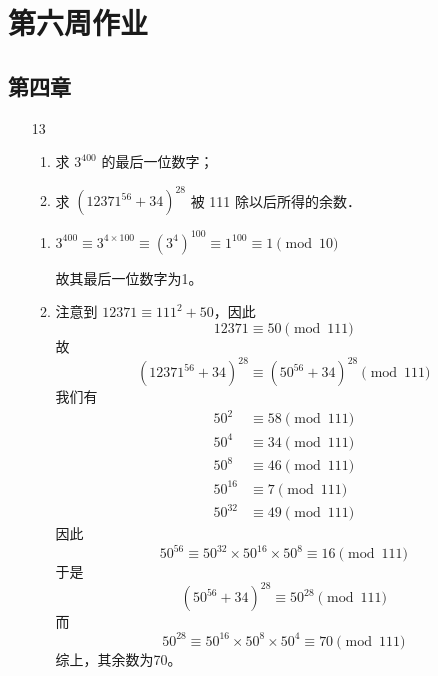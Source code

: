 \section{第六周作业}
\subsection*{第四章}

\begin{enumerate}
    \item[13] \begin{enumerate}
        \item 求 $3^{400}$ 的最后一位数字；
        \item 求 $\left(12371^{56}+34\right)^{28}$ 被 111 除以后所得的余数．
    \end{enumerate}

\begin{solution}
    \begin{enumerate}
        \item $3^{400} \equiv 3^{4 \times 100} \equiv (3^4)^{100} \equiv 1^{100} \equiv 1 \pmod{10}$
        
    故其最后一位数字为1。
    
    \item  注意到 $12371 \equiv 111^2 + 50$，因此
    \begin{equation*}
        12371 \equiv 50 \pmod{111}
    \end{equation*}
    故
    \begin{equation*}
        (12371^{56} + 34)^{28} \equiv (50^{56} + 34)^{28} \pmod{111}
    \end{equation*}
    我们有
    \begin{align*}
    50^2 &\equiv 58 \pmod{111}\\
    50^4 &\equiv 34 \pmod{111}\\
    50^8 &\equiv 46 \pmod{111}\\
    50^{16} &\equiv 7 \pmod{111}\\
    50^{32} &\equiv 49 \pmod{111}
    \end{align*}
    因此
    \begin{equation*}
        50^{56} \equiv 50^{32} \times 50^{16} \times 50^8 \equiv 16 \pmod{111}
    \end{equation*}
    于是
    \begin{equation*}
        (50^{56} + 34)^{28} \equiv 50^{28} \pmod{111}
    \end{equation*}
    而
    \begin{equation*}
        50^{28} \equiv 50^{16} \times 50^8 \times 50^4 \equiv 70 \pmod{111}
    \end{equation*}
    综上，其余数为70。
    \end{enumerate}
\end{solution}


\end{enumerate}
